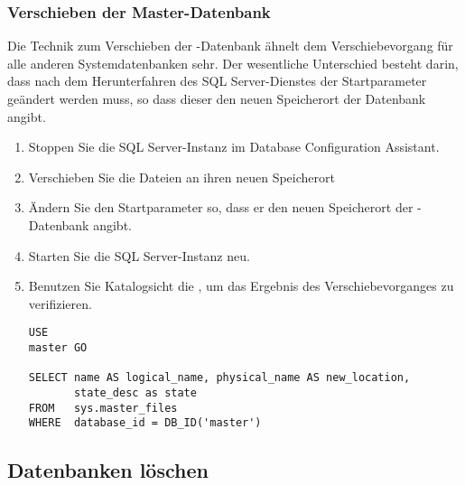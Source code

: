         \subsubsection{Verschieben der Master-Datenbank}
          Die Technik zum Verschieben der -Datenbank ähnelt
          dem Verschiebevorgang f\"ur alle anderen Systemdatenbanken sehr. Der
          wesentliche Unterschied besteht darin, dass nach dem Herunterfahren
          des SQL Server-Dienstes der Startparameter  geändert
          werden muss, so dass dieser den neuen Speicherort der Datenbank
          angibt.
          \begin{enumerate}
              \item Stoppen Sie die SQL Server-Instanz im Database Configuration
              Assistant.
              \item Verschieben Sie die Dateien an ihren neuen Speicherort
              \item Ändern Sie den Startparameter  so, dass er den
              neuen Speicherort der -Datenbank angibt.
              \item Starten Sie die SQL Server-Instanz neu.
              \item Benutzen Sie Katalogsicht die
              , um das Ergebnis des
              Verschiebevorganges zu verifizieren.
                \begin{lstlisting}[language=ms_sql,caption={Abfragen
                der View \identifier{sys.master\_files}},label=admin03_24]
USE
master GO

SELECT name AS logical_name, physical_name AS new_location, 
       state_desc as state
FROM   sys.master_files
WHERE  database_id = DB_ID('master')
                \end{lstlisting}
          \end{enumerate}
      \subsection{Datenbanken löschen}
